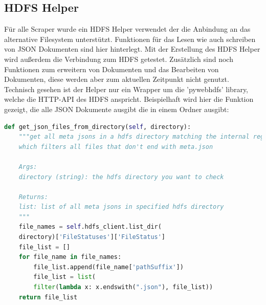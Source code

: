 \documentclass[12pt,oneside,a4paper,parskip]{scrbook}
\begin{document}
\subsection{HDFS Helper}
F\"ur alle Scraper wurde ein HDFS Helper verwendet der die Anbindung an das alternative Filesystem unterst\"utzt. Funktionen f\"ur das Lesen wie auch schreiben von JSON Dokumenten sind hier hinterlegt.
Mit der Erstellung des HDFS Helper wird außerdem die Verbindung zum HDFS getestet. Zus\"atzlich sind noch Funktionen zum erweitern von Dokumenten und das Bearbeiten von Dokumenten, diese werden aber zum aktuellen Zeitpunkt nicht genutzt. \newline
Technisch gesehen ist der Helper nur ein Wrapper um die 'pywebhdfs' library, welche die HTTP-API des HDFS anspricht.
Beispielhaft wird hier die Funktion gezeigt, die alle JSON Dokumente ausgibt die in einem Ordner ausgibt:
\begin{lstlisting}[caption=HDFS Helper Beispiel ,label=hdfsHelperJsonInDoc,language=python]
def get_json_files_from_directory(self, directory):
	"""get all meta jsons in a hdfs directory matching the internal regex pattern
	which filters all files that don't end with meta.json

	Args:
	directory (string): the hdfs directory you want to check

	Returns:
	list: list of all meta jsons in specified hdfs directory
	"""
	file_names = self.hdfs_client.list_dir(
	directory)['FileStatuses']['FileStatus']
	file_list = []
	for file_name in file_names:
		file_list.append(file_name['pathSuffix'])
		file_list = list(
		filter(lambda x: x.endswith(".json"), file_list))
	return file_list

\end{lstlisting}
\end{document}
